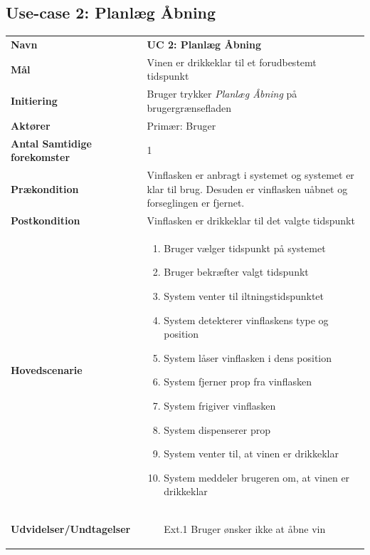 \subsection{Use-case 2: Planlæg Åbning}

\begin{longtable}{>{\bfseries}p{100pt} p{300pt}}
	
	Navn & \bfseries{UC 2: Planlæg Åbning} \\
	Mål & Vinen er drikkeklar til et forudbestemt tidspunkt\\
	Initiering & Bruger trykker \emph{Planlæg Åbning} på brugergrænsefladen\\
	Aktører & Primær: Bruger \\
	Antal Samtidige forekomster & 1 \\
	Prækondition & Vinflasken er anbragt i systemet og systemet er klar til brug. Desuden er vinflasken uåbnet og forseglingen er fjernet. \\
	Postkondition & Vinflasken er drikkeklar til det valgte tidspunkt\\
	Hovedscenarie & \begin{enumerate}
		\item Bruger vælger tidspunkt på systemet
		\subitem [Ext. 1: Bruger ønsker ikke at åbne vin] 
		\item Bruger bekræfter valgt tidspunkt
		\subitem [Ext. 2: Vinen kan ikke iltes korrekt til det valgte tidspunkt]
		\item System venter til iltningstidspunktet
		\subitem [Ext. 3: System registrererugyldig type af vinflaske]
		\item System detekterer vinflaskens type og position
		\subitem [Ext. 4: System registrerer ugyldig type af vinflaske]
		\subitem [Ext. 5: System kan ikke registrere en vinflaske]
		\item System låser vinflasken i dens position
		\item System fjerner prop fra vinflasken
		\item System frigiver vinflasken
		\item System dispenserer prop
		\item System venter til, at vinen er drikkeklar
		\item System meddeler brugeren om, at vinen er drikkeklar		
	\end{enumerate} \\
	Udvidelser/Undtagelser & 
	\begin{enumerate}
		\item[Ext.1] Bruger ønsker ikke at åbne vin 
		

\end{enumerate}
\end{longtable}
